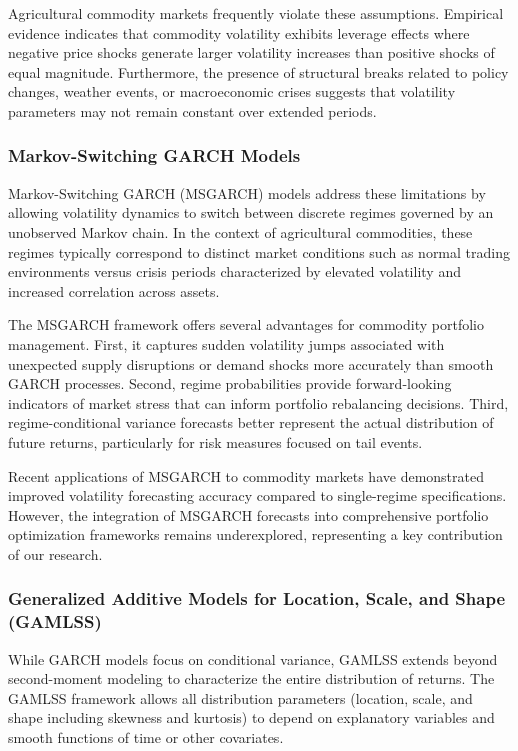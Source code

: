 \documentclass[
  10pt,
  a4paper,
]{article}
\begin{document}
Agricultural commodity markets frequently violate these assumptions.
Empirical evidence indicates that commodity volatility exhibits leverage
effects where negative price shocks generate larger volatility increases
than positive shocks of equal magnitude. Furthermore, the presence of
structural breaks related to policy changes, weather events, or
macroeconomic crises suggests that volatility parameters may not remain
constant over extended periods.

\subsubsection{Markov-Switching GARCH
Models}\label{markov-switching-garch-models}

Markov-Switching GARCH (MSGARCH) models address these limitations by
allowing volatility dynamics to switch between discrete regimes governed
by an unobserved Markov chain. In the context of agricultural
commodities, these regimes typically correspond to distinct market
conditions such as normal trading environments versus crisis periods
characterized by elevated volatility and increased correlation across
assets.

The MSGARCH framework offers several advantages for commodity portfolio
management. First, it captures sudden volatility jumps associated with
unexpected supply disruptions or demand shocks more accurately than
smooth GARCH processes. Second, regime probabilities provide
forward-looking indicators of market stress that can inform portfolio
rebalancing decisions. Third, regime-conditional variance forecasts
better represent the actual distribution of future returns, particularly
for risk measures focused on tail events.

Recent applications of MSGARCH to commodity markets have demonstrated
improved volatility forecasting accuracy compared to single-regime
specifications. However, the integration of MSGARCH forecasts into
comprehensive portfolio optimization frameworks remains underexplored,
representing a key contribution of our research.

\subsubsection{Generalized Additive Models for Location, Scale, and
Shape
(GAMLSS)}\label{generalized-additive-models-for-location-scale-and-shape-gamlss}

While GARCH models focus on conditional variance, GAMLSS extends beyond
second-moment modeling to characterize the entire distribution of
returns. The GAMLSS framework allows all distribution parameters
(location, scale, and shape including skewness and kurtosis) to depend
on explanatory variables and smooth functions of time or other
covariates.
\end{document}
